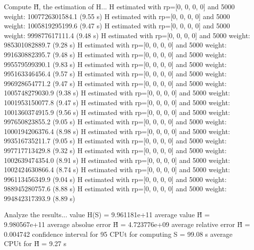 Compute H̃, the estimation of H...
  H estimated with rp=[0, 0, 0, 0] and 5000 weight:  1007726301584.1  (9.55 s)
  H estimated with rp=[0, 0, 0, 0] and 5000 weight:  1005819295199.6  (9.47 s)
  H estimated with rp=[0, 0, 0, 0] and 5000 weight:  999877617111.4  (9.48 s)
  H estimated with rp=[0, 0, 0, 0] and 5000 weight:  985301082889.7  (9.28 s)
  H estimated with rp=[0, 0, 0, 0] and 5000 weight:  991630882395.7  (9.48 s)
  H estimated with rp=[0, 0, 0, 0] and 5000 weight:  995579599390.1  (9.83 s)
  H estimated with rp=[0, 0, 0, 0] and 5000 weight:  995163346456.4  (9.57 s)
  H estimated with rp=[0, 0, 0, 0] and 5000 weight:  996928654771.2  (9.47 s)
  H estimated with rp=[0, 0, 0, 0] and 5000 weight:  1005748279030.9  (9.38 s)
  H estimated with rp=[0, 0, 0, 0] and 5000 weight:  1001953150077.8  (9.47 s)
  H estimated with rp=[0, 0, 0, 0] and 5000 weight:  1001360374915.9  (9.56 s)
  H estimated with rp=[0, 0, 0, 0] and 5000 weight:  997650823855.2  (9.05 s)
  H estimated with rp=[0, 0, 0, 0] and 5000 weight:  1000194206376.4  (8.98 s)
  H estimated with rp=[0, 0, 0, 0] and 5000 weight:  993516735211.7  (9.05 s)
  H estimated with rp=[0, 0, 0, 0] and 5000 weight:  997717713429.8  (9.32 s)
  H estimated with rp=[0, 0, 0, 0] and 5000 weight:  1002639474354.0  (8.91 s)
  H estimated with rp=[0, 0, 0, 0] and 5000 weight:  1002424630866.4  (8.74 s)
  H estimated with rp=[0, 0, 0, 0] and 5000 weight:  996113456349.9  (9.04 s)
  H estimated with rp=[0, 0, 0, 0] and 5000 weight:  988945280757.6  (8.88 s)
  H estimated with rp=[0, 0, 0, 0] and 5000 weight:  994842317393.9  (8.89 s)

Analyze the results...
  value H(S)                  = 9.961181e+11 
  average value H̃             = 9.980567e+11 
  average absolue error H̃     = 4.723776e+09 
  average relative error H̃    = 0.004742 
  confidence interval for 95%
  CPUt for computing S         = 99.08 s
  average CPUt for H̃           = 9.27 s

